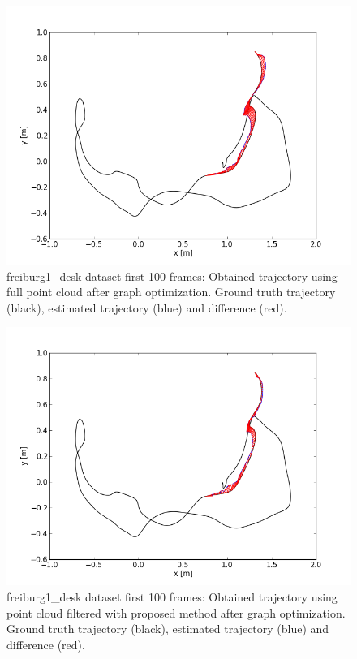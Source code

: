 \begin{figure}[H]
\begin{center}
\includegraphics[scale=0.75]{images/freiburg1_desk_1_100_fullcloud_optimized.png}
\caption{freiburg1\_desk dataset first 100 frames: Obtained trajectory using full point cloud after graph optimization. Ground truth trajectory (black), estimated trajectory (blue) and difference (red).}
\label{fig:jan}
\end{center}
\end{figure}

\begin{figure}[H]
\begin{center}
\includegraphics[scale=0.75]{images/freiburg1_desk_1_100_optimized.png}
\caption{freiburg1\_desk dataset first 100 frames: Obtained trajectory using point cloud filtered with proposed method after graph optimization. Ground truth trajectory (black), estimated trajectory (blue) and difference (red).}
\label{fig:jan}
\end{center}
\end{figure}

